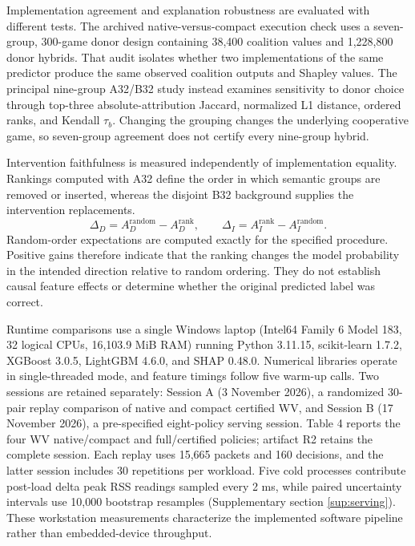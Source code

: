 \documentclass[final,3p,10pt,nopreprintline]{elsarticle}
\begin{document}
Implementation agreement and explanation robustness are evaluated with different tests. The archived native-versus-compact execution check uses a seven-group, 300-game donor design containing 38,400 coalition values and 1,228,800 donor hybrids. That audit isolates whether two implementations of the same predictor produce the same observed coalition outputs and Shapley values. The principal nine-group A32/B32 study instead examines sensitivity to donor choice through top-three absolute-attribution Jaccard, normalized L1 distance, ordered ranks, and Kendall \(\tau_b\). Changing the grouping changes the underlying cooperative game, so seven-group agreement does not certify every nine-group hybrid.

Intervention faithfulness is measured independently of implementation equality. Rankings computed with A32 define the order in which semantic groups are removed or inserted, whereas the disjoint B32 background supplies the intervention replacements. 
\begin{equation}\Delta_D=A_D^{\mathrm{random}}-A_D^{\mathrm{rank}},\qquad\Delta_I=A_I^{\mathrm{rank}}-A_I^{\mathrm{random}}.\label{eq:gains}\end{equation}
Random-order expectations are computed exactly for the specified procedure. Positive gains therefore indicate that the ranking changes the model probability in the intended direction relative to random ordering. They do not establish causal feature effects or determine whether the original predicted label was correct.

Runtime comparisons use a single Windows laptop (Intel64 Family 6 Model 183, 32 logical CPUs, 16,103.9 MiB RAM) running Python 3.11.15, scikit-learn 1.7.2, XGBoost 3.0.5, LightGBM 4.6.0, and SHAP 0.48.0. Numerical libraries operate in single-threaded mode, and feature timings follow five warm-up calls. Two sessions are retained separately: Session A (3 November 2026), a randomized 30-pair replay comparison of native and compact certified WV, and Session B (17 November 2026), a pre-specified eight-policy serving session. Table 4 reports the four WV native/compact and full/certified policies; artifact R2 retains the complete session. Each replay uses 15,665 packets and 160 decisions, and the latter session includes 30 repetitions per workload. Five cold processes contribute post-load delta peak RSS readings sampled every 2 ms, while paired uncertainty intervals use 10,000 bootstrap resamples (Supplementary section \ref*{sup:serving}). These workstation measurements characterize the implemented software pipeline rather than embedded-device throughput.
\end{document}
